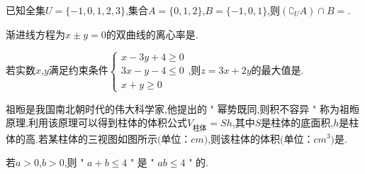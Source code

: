 \question[6] 已知全集$U=\{-1 , 0 , 1 , 2 , 3\}$,集合$A=\{0 , 1 , 2\}$,$B=\{-1 , 0 , 1\}$,则$( \complement  _{U} A) \cap B=$.
\begin{solution}{4cm}

\end{solution}


\question[4] 渐进线方程为$x \pm y=0$的双曲线的离心率是.
\begin{solution}{4cm}

\end{solution}



\question[4] 若实数$x$,$y$满足约束条件$\left\{\begin{array}{l}{x-3 y+4 \geqslant 0} \\ {3 x-y-4 \leqslant 0} \\ {x+y \geqslant 0}\end{array}\right.$,则$z=3x+2y$的最大值是.


\begin{solution}{4cm}

\end{solution}



\question[4] 祖暅是我国南北朝时代的伟大科学家,他提出的 " 幂势既同,则积不容异 " 称为祖暅原理,利用该原理可以得到柱体的体积公式$V _{\text{柱体}} =Sh$,其中$S$是柱体的底面积,$h$是柱体的高$.$若某柱体的三视图如图所示$($单位：$cm)$,则该柱体的体积$($单位：$cm ^{3} )$是.


\begin{center}
\vspace{0.5cm}
\end{center}
\begin{solution}{4cm}

\end{solution}



\question[4] 若$a  \gt  0$,$b  \gt  0$,则 " $a+b\leqslant 4$ " 是 " $ab\leqslant 4$ " 的.
\begin{solution}{4cm}

\end{solution}



